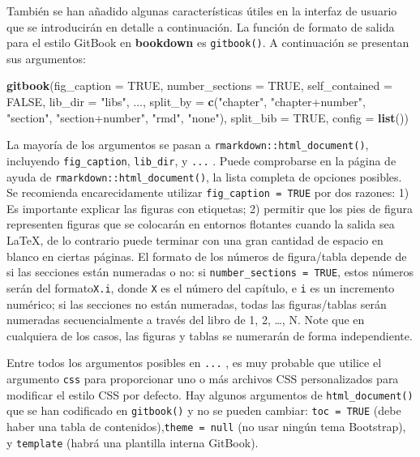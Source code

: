 \documentclass[12pt,]{krantz}
\makeatletter
\newenvironment{Shaded}{\begin{snugshade}}{\end{snugshade}}
\newcommand{\KeywordTok}[1]{\textcolor[rgb]{0.13,0.29,0.53}{\textbf{#1}}}
\newcommand{\DataTypeTok}[1]{\textcolor[rgb]{0.13,0.29,0.53}{#1}}
\newcommand{\StringTok}[1]{\textcolor[rgb]{0.31,0.60,0.02}{#1}}
\newcommand{\OtherTok}[1]{\textcolor[rgb]{0.56,0.35,0.01}{#1}}
\newcommand{\NormalTok}[1]{#1}
\newenvironment{kframe}{%
\medskip{}
\setlength{\fboxsep}{.8em}
 \def\at@end@of@kframe{}%
 \ifinner\ifhmode%
  \def\at@end@of@kframe{\end{minipage}}%
  \begin{minipage}{\columnwidth}%
 \fi\fi%
 \def\FrameCommand##1{\hskip\@totalleftmargin \hskip-\fboxsep
 \colorbox{shadecolor}{##1}\hskip-\fboxsep
     \hskip-\linewidth \hskip-\@totalleftmargin \hskip\columnwidth}%
 \MakeFramed {\advance\hsize-\width
   \@totalleftmargin\z@ \linewidth\hsize
   \@setminipage}}%
 {\par\unskip\endMakeFramed%
 \at@end@of@kframe}
\renewenvironment{Shaded}{\begin{kframe}}{\end{kframe}}
\theoremstyle{definition}
\theoremstyle{definition}
\theoremstyle{definition}
\theoremstyle{remark}
\makeatother
\begin{document}
También se han añadido algunas características útiles en la interfaz de
usuario que se introducirán en detalle a continuación. La función de
formato de salida para el estilo GitBook en \textbf{bookdown} es
\texttt{gitbook()}. A continuación se presentan sus argumentos:

\begin{Shaded}
\begin{Highlighting}[]
\KeywordTok{gitbook}\NormalTok{(}\DataTypeTok{fig_caption =} \OtherTok{TRUE}\NormalTok{, }\DataTypeTok{number_sections =} \OtherTok{TRUE}\NormalTok{,}
  \DataTypeTok{self_contained =} \OtherTok{FALSE}\NormalTok{, }\DataTypeTok{lib_dir =} \StringTok{"libs"}\NormalTok{, ...,}
  \DataTypeTok{split_by =} \KeywordTok{c}\NormalTok{(}\StringTok{"chapter"}\NormalTok{, }\StringTok{"chapter+number"}\NormalTok{, }\StringTok{"section"}\NormalTok{, }\StringTok{"section+number"}\NormalTok{, }\StringTok{"rmd"}\NormalTok{, }\StringTok{"none"}\NormalTok{),}
  \DataTypeTok{split_bib =} \OtherTok{TRUE}\NormalTok{, }\DataTypeTok{config =} \KeywordTok{list}\NormalTok{())}
\end{Highlighting}
\end{Shaded}

La mayoría de los argumentos se pasan a
\texttt{rmarkdown::html\_document()}, incluyendo \texttt{fig\_caption},
\texttt{lib\_dir}, y \texttt{...} . Puede comprobarse en la página de
ayuda de \texttt{rmarkdown::html\_document()}, la lista completa de
opciones posibles. Se recomienda encarecidamente utilizar
\texttt{fig\_caption\ =\ TRUE} por dos razones: 1) Es importante
explicar las figuras con etiquetas; 2) permitir que los pies de figura
representen figuras que se colocarán en entornos flotantes cuando la
salida sea LaTeX, de lo contrario puede terminar con una gran cantidad
de espacio en blanco en ciertas páginas. El formato de los números de
figura/tabla depende de si las secciones están numeradas o no: si
\texttt{number\_sections\ =\ TRUE}, estos números serán del
formato\texttt{X.i}, donde \texttt{X} es el número del capítulo, e
\texttt{i} es un incremento numérico; si las secciones no están
numeradas, todas las figuras/tablas serán numeradas secuencialmente a
través del libro de 1, 2, \ldots{}, N. Note que en cualquiera de los
casos, las figuras y tablas se numerarán de forma independiente.

Entre todos los argumentos posibles en \texttt{...} , es muy probable
que utilice el argumento \texttt{css} para proporcionar uno o más
archivos CSS personalizados para modificar el estilo CSS por defecto.
Hay algunos argumentos de \texttt{html\_document()} que se han
codificado en \texttt{gitbook()} y no se pueden cambiar:
\texttt{toc\ =\ TRUE} (debe haber una tabla de
contenidos),\texttt{theme\ =\ null} (no usar ningún tema Bootstrap), y
\texttt{template} (habrá una plantilla interna GitBook).
\end{document}
